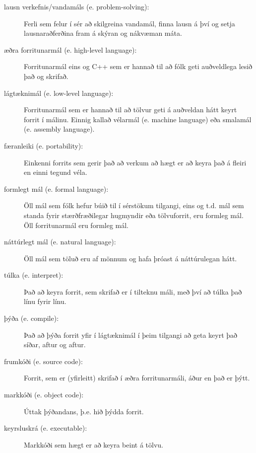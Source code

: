 \begin{description}

\item[lausn verkefnis/vandamáls (e. problem-solving):]
Ferli sem felur í sér að skilgreina vandamál, finna lausn á því og setja lausnaraðferðina fram á skýran og nákvæman máta.

\item[æðra forritunarmál (e. high-level language):]
Forritunarmál eins og C++ sem er hannað til að fólk geti auðveldlega lesið það og skrifað.

\item[lágtæknimál (e. low-level language):]
Forritunarmál sem er hannað til að tölvur geti á auðveldan hátt keyrt forrit í málinu.
Einnig kallað vélarmál (e. machine language) eða smalamál (e. assembly language).

\item[færanleiki (e. portability):]  Einkenni forrits sem gerir það að verkum að hægt er að keyra það á fleiri en einni tegund véla.

\item[formlegt mál (e. formal language):]  Öll mál sem fólk hefur búið til í sérstökum tilgangi, eins og t.d. mál sem standa fyrir stærðfræðilegar hugmyndir eða tölvuforrit, eru formleg mál.
Öll forritunarmál eru formleg mál.

\item[náttúrlegt mál (e. natural language):]
Öll mál sem töluð eru af mönnum og hafa þróast á náttúrulegan hátt.

\item[túlka (e. interpret):]  Það að keyra forrit, sem skrifað er í tilteknu máli, með því að túlka það línu fyrir línu.

\item[þýða (e. compile):]  Það að þýða forrit yfir í lágtæknimál í þeim tilgangi að geta keyrt það síðar, aftur og aftur.

\item[frumkóði (e. source code):]  Forrit, sem er (yfirleitt) skrifað í æðra forritunarmáli, áður en það er þýtt.

\item[markkóði (e. object code):]  Úttak þýðandans, þ.e. hið þýdda forrit. 

\item[keyrsluskrá (e. executable):] Markkóði sem hægt er að keyra beint á tölvu. 



\end{description}
